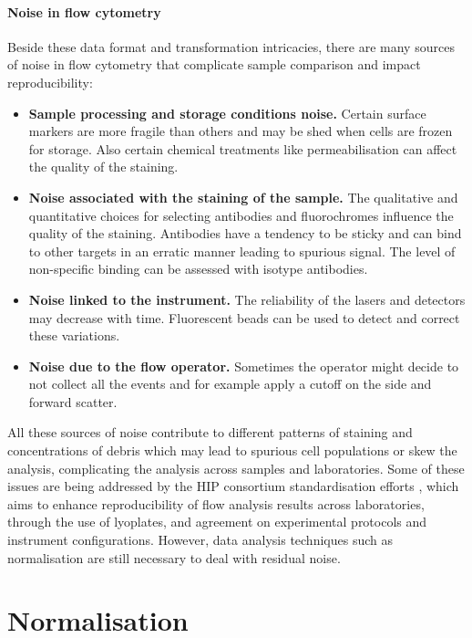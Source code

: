 \clearpage


\paragraph{Noise in flow cytometry} 
Beside these data format and transformation intricacies, there are many sources of noise in flow cytometry that complicate sample comparison and impact reproducibility:
\begin{itemize}
  \item \textbf{Sample processing and storage conditions noise.}
    Certain surface markers are more fragile than others and may be shed when cells are frozen for storage.
    Also certain chemical treatments like permeabilisation can affect the quality of the staining.
  \item \textbf{Noise associated with the staining of the sample.}
    The qualitative and quantitative choices for selecting antibodies and fluorochromes influence the quality of the staining.
    Antibodies have a tendency to be sticky and can bind to other targets in an erratic manner leading to spurious signal.
    The level of non-specific binding can be assessed with isotype antibodies.  
  \item \textbf{Noise linked to the instrument.}
    The reliability of the lasers and detectors may decrease with time.
    Fluorescent beads can be used to detect and correct these variations.  
  \item \textbf{Noise due to the flow operator.}
    Sometimes the operator might decide to not collect all the events and for example apply a cutoff on the side and forward scatter.
\end{itemize}
All these sources of noise contribute to different patterns of staining and concentrations of debris
which may lead to spurious cell populations or skew the analysis, complicating the analysis across samples and laboratories.
Some of these issues are being addressed by the \gls{HIP} consortium standardisation efforts \citep{Maecker:2012gl},
which aims to enhance reproducibility of flow analysis results across laboratories,
through the use of lyoplates, and agreement on experimental protocols and instrument configurations.
However, data analysis techniques such as normalisation are still necessary to deal with residual noise.

\section{Normalisation}

